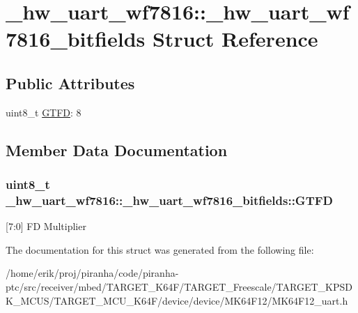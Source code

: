\hypertarget{struct__hw__uart__wf7816_1_1__hw__uart__wf7816__bitfields}{}\section{\+\_\+hw\+\_\+uart\+\_\+wf7816\+:\+:\+\_\+hw\+\_\+uart\+\_\+wf7816\+\_\+bitfields Struct Reference}
\label{struct__hw__uart__wf7816_1_1__hw__uart__wf7816__bitfields}
\subsection*{Public Attributes}
\begin{DoxyCompactItemize}
\item 
uint8\+\_\+t \hyperlink{struct__hw__uart__wf7816_1_1__hw__uart__wf7816__bitfields_aa3fe367adc6e73316f4974fb043287c0}{G\+T\+FD}\+: 8
\end{DoxyCompactItemize}


\subsection{Member Data Documentation}
\subsubsection[{\texorpdfstring{G\+T\+FD}{GTFD}}]{\setlength{\rightskip}{0pt plus 5cm}uint8\+\_\+t \+\_\+hw\+\_\+uart\+\_\+wf7816\+::\+\_\+hw\+\_\+uart\+\_\+wf7816\+\_\+bitfields\+::\+G\+T\+FD}\hypertarget{struct__hw__uart__wf7816_1_1__hw__uart__wf7816__bitfields_aa3fe367adc6e73316f4974fb043287c0}{}\label{struct__hw__uart__wf7816_1_1__hw__uart__wf7816__bitfields_aa3fe367adc6e73316f4974fb043287c0}
\mbox{[}7\+:0\mbox{]} FD Multiplier 

The documentation for this struct was generated from the following file\+:\begin{DoxyCompactItemize}
\item 
/home/erik/proj/piranha/code/piranha-\/ptc/src/receiver/mbed/\+T\+A\+R\+G\+E\+T\+\_\+\+K64\+F/\+T\+A\+R\+G\+E\+T\+\_\+\+Freescale/\+T\+A\+R\+G\+E\+T\+\_\+\+K\+P\+S\+D\+K\+\_\+\+M\+C\+U\+S/\+T\+A\+R\+G\+E\+T\+\_\+\+M\+C\+U\+\_\+\+K64\+F/device/device/\+M\+K64\+F12/M\+K64\+F12\+\_\+uart.\+h\end{DoxyCompactItemize}
